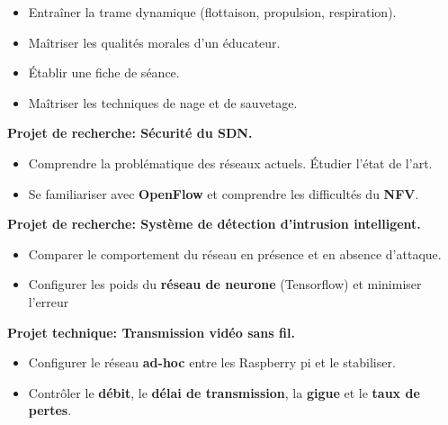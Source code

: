 \divider

\begin{itemize}
	\item Entraîner la trame dynamique (flottaison, propulsion, respiration).
	\item Maîtriser les qualités morales d'un éducateur.
	\item Établir une fiche de séance.
	\item Maîtriser les techniques de nage et de sauvetage.
\end{itemize}



\textbf{\large Projet de recherche: Sécurité du SDN.}
\medskip
\begin{itemize}
	\item Comprendre la problématique des réseaux actuels. Étudier l’état de l’art.
	\item Se familiariser avec \textbf {OpenFlow} et comprendre les difficultés du \textbf {NFV}.
\end{itemize}

\divider

\textbf{\large Projet de recherche: Système de détection d'intrusion intelligent.}
\medskip
\begin{itemize}
	\item Comparer le comportement du réseau en présence et en absence d'attaque.
	\item Configurer les poids du \textbf {réseau de neurone} (Tensorflow) et minimiser l'erreur
\end{itemize}

\divider

\textbf{\large Projet technique: Transmission vidéo sans fil.}
\medskip
\begin{itemize}
	\item Configurer le réseau \textbf {ad-hoc} entre les Raspberry pi et le stabiliser.
	\item Contrôler le \textbf {débit}, le \textbf  {délai de transmission}, la \textbf {gigue} et le \textbf {taux de pertes}.
\end{itemize}

\divider


